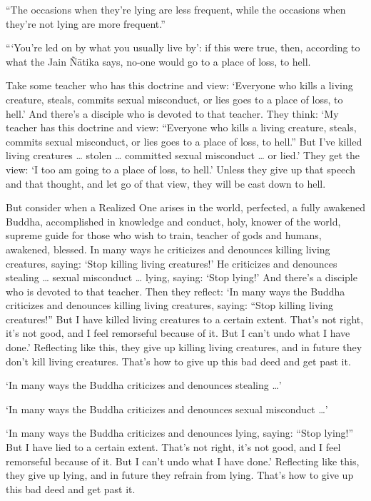 \documentclass[12pt,openany]{book}%
\begin{document}
“The occasions when they’re lying are less frequent, while the occasions when they’re not lying are more frequent.” 

“‘You’re led on by what you usually live by’: if this were true, then, according to what the Jain \textsanskrit{Ñātika} says, no-one would go to a place of loss, to hell. 

Take some teacher who has this doctrine and view: ‘Everyone who kills a living creature, steals, commits sexual misconduct, or lies goes to a place of loss, to hell.’ And there’s a disciple who is devoted to that teacher. They think: ‘My teacher has this doctrine and view: “Everyone who kills a living creature, steals, commits sexual misconduct, or lies goes to a place of loss, to hell.” But I’ve killed living creatures … stolen … committed sexual misconduct … or lied.’ They get the view: ‘I too am going to a place of loss, to hell.’ Unless they give up that speech and that thought, and let go of that view, they will be cast down to hell. 

But consider when a Realized One arises in the world, perfected, a fully awakened Buddha, accomplished in knowledge and conduct, holy, knower of the world, supreme guide for those who wish to train, teacher of gods and humans, awakened, blessed. In many ways he criticizes and denounces killing living creatures, saying: ‘Stop killing living creatures!’ He criticizes and denounces stealing … sexual misconduct … lying, saying: ‘Stop lying!’ And there’s a disciple who is devoted to that teacher. Then they reflect: ‘In many ways the Buddha criticizes and denounces killing living creatures, saying: “Stop killing living creatures!” But I have killed living creatures to a certain extent. That’s not right, it’s not good, and I feel remorseful because of it. But I can’t undo what I have done.’ Reflecting like this, they give up killing living creatures, and in future they don’t kill living creatures. That’s how to give up this bad deed and get past it. 

‘In many ways the Buddha criticizes and denounces stealing …’ 

‘In many ways the Buddha criticizes and denounces sexual misconduct …’ 

‘In many ways the Buddha criticizes and denounces lying, saying: “Stop lying!” But I have lied to a certain extent. That’s not right, it’s not good, and I feel remorseful because of it. But I can’t undo what I have done.’ Reflecting like this, they give up lying, and in future they refrain from lying. That’s how to give up this bad deed and get past it. 
\end{document}
